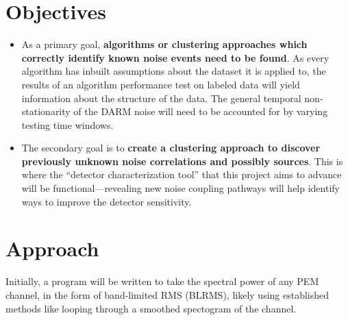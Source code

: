\section{Objectives}
\begin{itemize}
\item
As a primary goal, \textbf{algorithms or clustering approaches which correctly identify known noise events need to be found}.
As every algorithm has inbuilt assumptions about the dataset it is applied to, the results of an algorithm performance test on labeled data will yield information about the structure of the data.
The general temporal non-stationarity of the DARM noise will need to be accounted for by varying testing time windows.
\item
The secondary goal is to \textbf{create a clustering approach to discover previously unknown noise correlations and possibly sources}.
This is where the ``detector characterization tool'' that this project aims to advance will be functional---revealing new noise coupling pathways will help identify ways to improve the detector sensitivity.
\end{itemize}

\section{Approach}

Initially, a program will be written to take the spectral power of any PEM channel, in the form of band-limited RMS (BLRMS), likely using established methods like looping through a smoothed spectogram of the channel\cite{vajente}.

